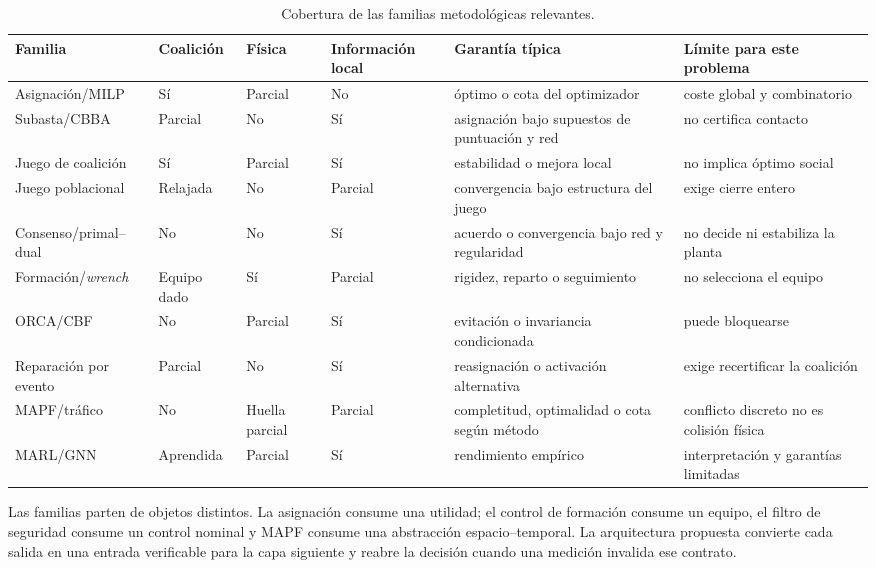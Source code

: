 \begin{table}[!htbp]
  \centering
  \caption{Cobertura de las familias metodológicas relevantes.}
  \label{tab:tf-comparison}
  \scriptsize
  \setlength{\tabcolsep}{2.4pt}
  \begin{tabularx}{\textwidth}{@{}p{2.0cm}p{1.25cm}p{1.35cm}p{1.45cm}X p{2.2cm}@{}}
    \toprule
    Familia & Coalición & Física & Información local & Garantía típica & Límite para este problema \\
    \midrule
    Asignación/MILP & Sí & Parcial & No & óptimo o cota del optimizador & coste global y combinatorio \\
    Subasta/CBBA & Parcial & No & Sí & asignación bajo supuestos de puntuación y red & no certifica contacto \\
    Juego de coalición & Sí & Parcial & Sí & estabilidad o mejora local & no implica óptimo social \\
    Juego poblacional & Relajada & No & Parcial & convergencia bajo estructura del juego & exige cierre entero \\
    Consenso/primal--dual & No & No & Sí & acuerdo o convergencia bajo red y regularidad & no decide ni estabiliza la planta \\
    Formación/\emph{wrench} & Equipo dado & Sí & Parcial & rigidez, reparto o seguimiento & no selecciona el equipo \\
    ORCA/CBF & No & Parcial & Sí & evitación o invariancia condicionada & puede bloquearse \\
    Reparación por evento & Parcial & No & Sí & reasignación o activación alternativa & exige recertificar la coalición \\
    MAPF/tráfico & No & Huella parcial & Parcial & completitud, optimalidad o cota según método & conflicto discreto no es colisión física \\
    MARL/GNN & Aprendida & Parcial & Sí & rendimiento empírico & interpretación y garantías limitadas \\
    \bottomrule
  \end{tabularx}
  \viuownsource
\end{table}

Las familias parten de objetos distintos. La asignación consume una utilidad; el control de formación consume un equipo, el filtro de seguridad consume un control nominal y MAPF consume una abstracción espacio--temporal. La arquitectura propuesta convierte cada salida en una entrada verificable para la capa siguiente y reabre la decisión cuando una medición invalida ese contrato.

